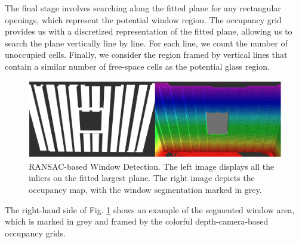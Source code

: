 The final stage involves searching along the fitted plane for any rectangular openings, which represent the potential window region. The occupancy grid provides us with a discretized representation of the fitted plane, allowing us to search the plane vertically line by line. For each line, we count the number of unoccupied cells. Finally, we consider the region framed by vertical lines that contain a similar number of free-space cells as the potential glass region.

\begin{figure}[h]
    \centering
    \includegraphics[width=1\columnwidth]{fig/ransac.png}
    \caption{RANSAC-based Window Detection. The left image displays all the inliers on the fitted largest plane. The right image depicts the occupancy map, with the window segmentation marked in grey.}
    \label{fig:ransac}
\end{figure}

The right-hand side of Fig. \ref{fig:ransac} shows an example of the segmented window area, which is marked in grey and framed by the colorful depth-camera-based occupancy grids.